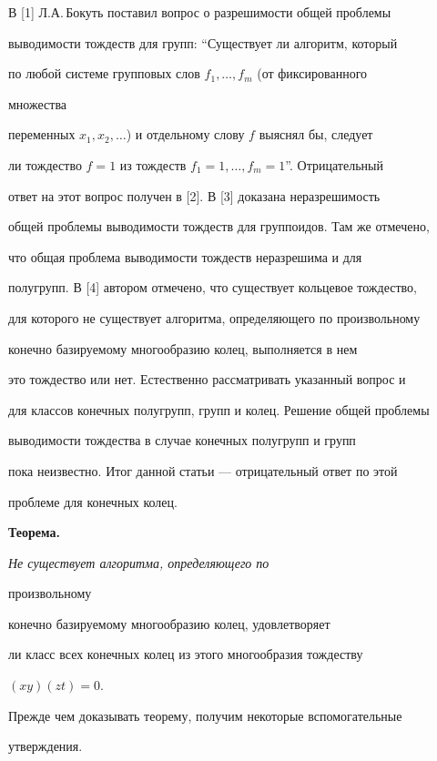 В [1] Л.А.\,Бокуть поставил вопрос о разрешимости общей проблемы  


выводимости тождеств для групп: ``Существует ли алгоритм, который  


по любой системе групповых слов $f_1,\dotsc,f_m$ (от фиксированного 


множества  


переменных $x_1,x_2,\dotsc$) и отдельному слову $f$ выяснял бы, следует  


ли тождество $f=1$ из тождеств $f_1=1,\dotsc,f_m=1$''. Отрицательный 


ответ на этот вопрос получен в [2]. В [3] доказана неразрешимость  


общей проблемы выводимости тождеств для группоидов. Там же отмечено,  


что общая проблема выводимости тождеств неразрешима и для  


полугрупп. В [4] автором отмечено, что существует кольцевое тождество,  


для которого не существует алгоритма, определяющего по произвольному  


конечно базируемому многообразию колец, выполняется в нем  


это тождество или нет. Естественно рассматривать указанный вопрос и  


для классов конечных полугрупп, групп и колец. Решение общей проблемы  


выводимости тождества в случае конечных полугрупп и групп 


пока неизвестно. Итог данной статьи --- отрицательный ответ по этой 


проблеме для конечных колец. 


\medskip 


 


{\bf Теорема.} {\it Не существует алгоритма, определяющего по 


произвольному  


конечно базируемому многообразию колец, удовлетворяет  


ли класс всех конечных колец из этого многообразия тождеству  


$(xy)(zt)=0$.} 


\medskip 


 


Прежде чем доказывать теорему, получим некоторые вспомогательные 


утверждения. 


